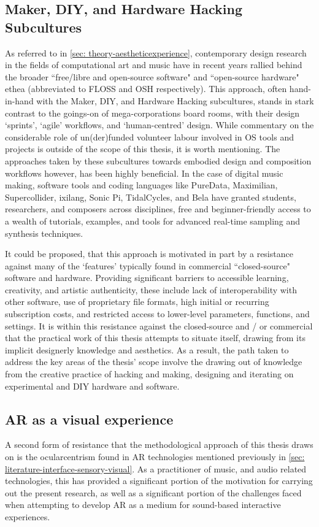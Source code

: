 \subsection{Maker, DIY, and Hardware Hacking Subcultures}\label{sec: method-resistance-maker}
As referred to in \autoref{sec: theory-aestheticexperience}, contemporary design research in the fields of computational art and music have in recent years rallied behind the broader ``free/libre and open-source software" and ``open-source hardware" ethea (abbreviated to FLOSS and OSH respectively). This approach, often hand-in-hand with the Maker, DIY, and Hardware Hacking subcultures, stands in stark contrast to the goings-on of mega-corporations board rooms, with their design `sprints', `agile' workflows, and `human-centred' design. While commentary on the considerable role of un(der)funded volunteer labour involved in OS tools and projects is outside of the scope of this thesis, it is worth mentioning. The approaches taken by these subcultures towards embodied design and composition workflows however, has been highly beneficial. In the case of digital music making, software tools and coding languages like PureData, Maximilian, Supercollider, ixilang, Sonic Pi, TidalCycles, and Bela have granted students, researchers, and composers across disciplines, free and beginner-friendly access to a wealth of tutorials, examples, and tools for advanced real-time sampling and synthesis techniques.

It could be proposed, that this approach is motivated in part by a resistance against many of the `features' typically found in commercial ``closed-source" software and hardware. Providing significant barriers to accessible learning, creativity, and artistic authenticity, these include lack of interoperability with other software, use of proprietary file formats, high initial or recurring subscription costs, and restricted access to lower-level parameters, functions, and settings. It is within this resistance against the closed-source and / or commercial that the practical work of this thesis attempts to situate itself, drawing from its implicit designerly knowledge and aesthetics. As a result, the path taken to address the key areas of the thesis' scope involve the drawing out of knowledge from the creative practice of hacking and making, designing and iterating on experimental and DIY hardware and software.

\subsection{AR as a visual experience}\label{sec: method-resistance-visual}
A second form of resistance that the methodological approach of this thesis draws on is the ocularcentrism found in AR technologies mentioned previously in \autoref{sec: literature-interface-sensory-visual}. As a practitioner of music, and audio related technologies, this has provided a significant portion of the motivation for carrying out the present research, as well as a significant portion of the challenges faced when attempting to develop AR as a medium for sound-based interactive experiences. %

